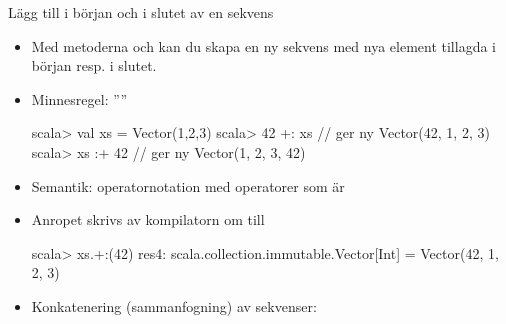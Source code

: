 \begin{Slide}{Lägg till i början och i slutet av en sekvens}
  \begin{itemize}
  \item Med metoderna \code{+:} och \code{:+} kan du skapa en ny sekvens med nya element tillagda i början resp. i slutet.
  \item Minnesregel: ''''
  \begin{REPLnonum}
  scala> val xs = Vector(1,2,3)
  scala> 42 +: xs         // ger ny Vector(42, 1, 2, 3)
  scala> xs :+ 42         // ger ny Vector(1, 2, 3, 42)
  \end{REPLnonum}
  \pause
  \item Semantik: operatornotation med operatorer som  är 
  \item Anropet  skrivs av kompilatorn om till 
  \begin{REPL}
  scala> xs.+:(42)
  res4: scala.collection.immutable.Vector[Int] = Vector(42, 1, 2, 3)
  \end{REPL}
  \pause
  \item Konkatenering (sammanfogning) av sekvenser: 
  
  \end{itemize}
\end{Slide}


